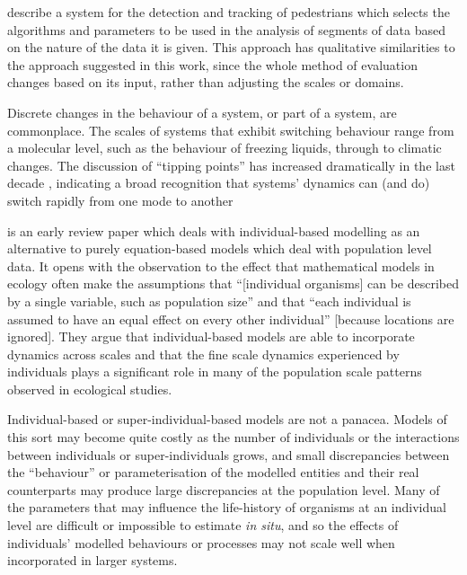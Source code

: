\Cite{DBLP:ZhangZR16} describe a system for the detection and tracking
of pedestrians which selects the algorithms and parameters to be used
in the analysis of segments of data based on the nature of the data it
is given. This approach has qualitative similarities to the approach
suggested in this work, since the whole method of evaluation changes
based on its input, rather than adjusting the scales or domains.

Discrete changes in the behaviour of a system, or part of a system,
are commonplace. The scales of systems that exhibit switching
behaviour range from a molecular level, such as the behaviour of
freezing liquids, through to climatic changes.  The discussion of
``tipping points'' has increased dramatically in the last decade
\citep{bhatanacharoentipping}, indicating a broad recognition that
systems' dynamics can (and do) switch rapidly from one mode to another

\Cite{huston1988new} is an early review paper which deals with
individual-based modelling as an alternative to purely equation-based
models which deal with population level data.  It opens with the
observation to the effect that mathematical models in ecology often
make the assumptions that ``[individual organisms] can be described by
a single variable, such as population size'' and that ``each
individual is assumed to have an equal effect on every other
individual'' [because locations are ignored]. They argue that
individual-based models are able to incorporate dynamics across scales
and that the fine scale dynamics experienced by individuals plays a
significant role in many of the population scale patterns observed in
ecological studies.

Individual-based or super-individual-based models are not a panacea.
Models of this sort may become quite costly as the number of
individuals or the interactions between individuals or
super-individuals grows, and small discrepancies between the
``behaviour'' or parameterisation of the modelled entities and their
real counterparts may produce large discrepancies at the population
level. Many of the parameters that may influence the life-history of
organisms at an individual level are difficult or impossible to
estimate \emph{in situ}, and so the effects of individuals' modelled
behaviours or processes may not scale well when incorporated in larger
systems.


